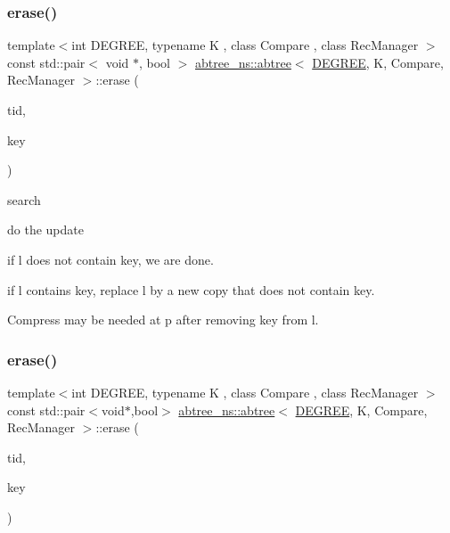 \subsubsection{\texorpdfstring{erase()}{erase()}\hspace{0.1cm}{\footnotesize\ttfamily [1/2]}}
{\footnotesize\ttfamily template$<$int D\+E\+G\+R\+EE, typename K , class Compare , class Rec\+Manager $>$ \\
const std\+::pair$<$ void $\ast$, bool $>$ \hyperlink{classabtree__ns_1_1abtree}{abtree\+\_\+ns\+::abtree}$<$ \hyperlink{brown__sigouin__abtree__kcas_2adapter_8h_a5d88b17d70c985f2f2b8e987037fd6dd}{D\+E\+G\+R\+EE}, K, Compare, Rec\+Manager $>$\+::erase (\begin{DoxyParamCaption}\item[{const int}]{tid,  }\item[{const K \&}]{key }\end{DoxyParamCaption})}

search

do the update

if l does not contain key, we are done.

if l contains key, replace l by a new copy that does not contain key.

Compress may be needed at p after removing key from l.\mbox{\label{classabtree__ns_1_1abtree_aa6d8cb4735285a40bbcb2dcf3849ea75}} 
\subsubsection{\texorpdfstring{erase()}{erase()}\hspace{0.1cm}{\footnotesize\ttfamily [2/2]}}
{\footnotesize\ttfamily template$<$int D\+E\+G\+R\+EE, typename K , class Compare , class Rec\+Manager $>$ \\
const std\+::pair$<$void$\ast$,bool$>$ \hyperlink{classabtree__ns_1_1abtree}{abtree\+\_\+ns\+::abtree}$<$ \hyperlink{brown__sigouin__abtree__kcas_2adapter_8h_a5d88b17d70c985f2f2b8e987037fd6dd}{D\+E\+G\+R\+EE}, K, Compare, Rec\+Manager $>$\+::erase (\begin{DoxyParamCaption}\item[{const int}]{tid,  }\item[{const K \&}]{key }\end{DoxyParamCaption})}

